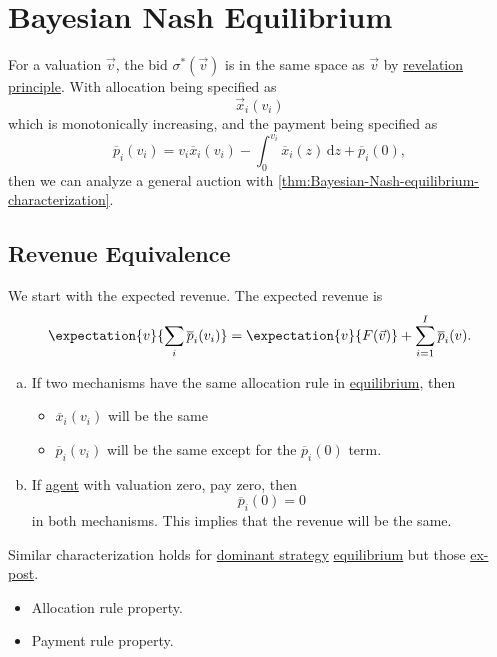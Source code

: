 \section{Bayesian Nash Equilibrium}
\begin{prev}
	For a valuation \(\vec{v}\), the bid \(\sigma^{\ast}(\vec{v})\) is in the same space as \(\vec{v}\) by \hyperref[thm:revelation-principle]{revelation principle}.
	With allocation being specified as
	\[
		\vec{x}_{i}(v_{i})
	\]
	which is monotonically increasing, and the payment being specified as
	\[
		\overline{p}_{i}(v_{i}) = v_{i}\overline{x}_{i}(v_{i}) - \int_0^{v_{i}}\overline{x}_{i}(z)\,\mathrm{d}z + \overline{p}_{i}(0),
	\]
	then we can analyze a general auction with \autoref{thm:Bayesian-Nash-equilibrium-characterization}.
\end{prev}

\subsection{Revenue Equivalence}
We start with the expected revenue. The expected revenue is
\[
	\expectation{v}{\sum\limits_{i}\overline{p}_{i}(v_{i}) } = \expectation{v}{F(\vec{v})} + \sum\limits_{i=1}^{I} \overline{p}_{i}(v).
\]
\begin{enumerate}[(a)]
	\item If two mechanisms have the same allocation rule in \hyperref[def:Nash-equilibrium]{equilibrium}, then
	      \begin{itemize}
		      \item \(\overline{x}_{i}(v_{i})\) will be the same
		      \item \(\overline{p}_{i}(v_{i})\) will be the same except for the \(\overline{p}_{i}(0)\) term.
	      \end{itemize}
	\item If \hyperref[def:player]{agent} with valuation zero, pay zero, then
	      \[
		      \overline{p}_{i}(0) = 0
	      \]
	      in both mechanisms. This implies that the revenue will be the same.
\end{enumerate}

\begin{note}
	Similar characterization holds for \hyperref[def:dominant-strategy]{dominant strategy} \hyperref[def:Nash-equilibrium]{equilibrium} but those \hyperref[def:ex-post]{ex-post}.
	\begin{itemize}
		\item Allocation rule property.
		\item Payment rule property.
	\end{itemize}
\end{note}

